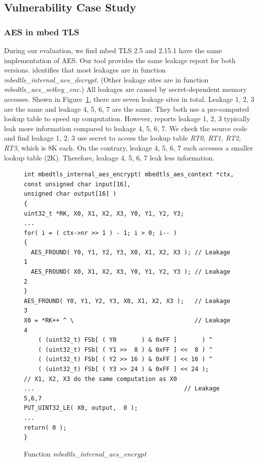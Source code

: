\subsection{Vulnerability Case Study}\label{sec:eval_case}
\subsubsection{AES in mbed TLS}
During our evaluation, we find mbed TLS 2.5 and 2.15.1 have the same
implementation of AES\@. Our tool provides the same leakage report for both
versions. \tool{} identifies that most leakages are in function
\emph{mbedtls\_internal\_aes\_decrypt}. (Other leakage sites are in function
\emph{mbedtls\_aes\_setkey\_enc}.) All leakages are caused by secret-dependent
memory accesses. Shown in Figure~\ref{mbedtls_aes}, there are seven leakage
sites in total. Leakage 1, 2, 3 are the same and leakage 4, 5, 6, 7 are the
same. They both use a pre-computed lookup table to speed up computation.
However, \tool{} reports leakage 1, 2, 3 typically leak more information
compared to leakage 4, 5, 6, 7. We check the source code and find leakage 1, 2,
3 use secret to access the lookup table \emph{RT0, RT1, RT2, RT3}, which is 8K
each. On the contrary, leakage 4, 5, 6, 7 each accesses a smaller lookup table
(2K). Therefore, leakage 4, 5, 6, 7 leak less information.

\begin{figure}%
    \centering
    \begin{lstlisting}[xleftmargin=.01\textwidth,xrightmargin=.01\textwidth]
int mbedtls_internal_aes_encrypt( mbedtls_aes_context *ctx,
const unsigned char input[16],
unsigned char output[16] )
{
uint32_t *RK, X0, X1, X2, X3, Y0, Y1, Y2, Y3;
...
for( i = ( ctx->nr >> 1 ) - 1; i > 0; i-- )
{
  AES_FROUND( Y0, Y1, Y2, Y3, X0, X1, X2, X3 ); // Leakage 1
  AES_FROUND( X0, X1, X2, X3, Y0, Y1, Y2, Y3 ); // Leakage 2
}
AES_FROUND( Y0, Y1, Y2, Y3, X0, X1, X2, X3 );   // Leakage 3
X0 = *RK++ ^ \                                  // Leakage 4
    ( (uint32_t) FSb[ ( Y0       ) & 0xFF ]       ) ^
    ( (uint32_t) FSb[ ( Y1 >>  8 ) & 0xFF ] <<  8 ) ^
    ( (uint32_t) FSb[ ( Y2 >> 16 ) & 0xFF ] << 16 ) ^
    ( (uint32_t) FSb[ ( Y3 >> 24 ) & 0xFF ] << 24 );
// X1, X2, X3 do the same computation as X0
...                                          // Leakage 5,6,7
PUT_UINT32_LE( X0, output,  0 );
...
return( 0 );
}
\end{lstlisting}
    \vspace*{-6pt}
    \caption{Function \textit{mbedtls\_internal\_aes\_encrypt}}
    \label{mbedtls_aes}
    \vspace*{-9pt}
\end{figure}


